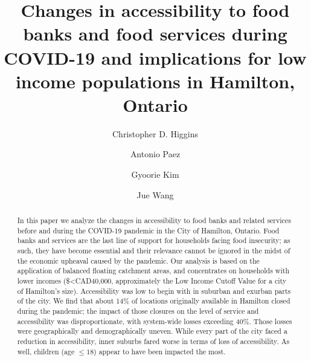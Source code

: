 \documentclass[]{elsarticle} %
\begin{document}
\begin{frontmatter}

  \title{Changes in accessibility to food banks and food services during
COVID-19 and implications for low income populations in Hamilton,
Ontario}
    \author[University of Toronto Scarborough]{Christopher D. Higgins}
    \author[McMaster University]{Antonio Paez}
    \author[University of Toronto Mississauga]{Gyoorie Kim}
    \author[University of Toronto Mississauga]{Jue Wang}
      \address[University of Toronto Scarborough]{Department of
Geography \& Planning, University of Toronto Scarborough, 1265 Military
Trail, Toronto, ON M1C1A4}
    \address[McMaster University]{School of Earth, Environment and
Society, McMaster University, Hamilton, ON, L8S 4K1, Canada}
    \address[University of Toronto Mississauga]{Department of Geography,
Geomatics and Environment, University of Toronto Mississauga, 3359
Mississauga Road, Mississauga, ON, L5L 1C6 , Canada}
  
  \begin{abstract}
  In this paper we analyze the changes in accessibility to food banks
  and related services before and during the COVID-19 pandemic in the
  City of Hamilton, Ontario. Food banks and services are the last line
  of support for households facing food insecurity; as such, they have
  become essential and their relevance cannot be ignored in the midst of
  the economic upheaval caused by the pandemic. Our analysis is based on
  the application of balanced floating catchment areas, and concentrates
  on households with lower incomes (\$\textless CAD40,000, approximately
  the Low Income Cutoff Value for a city of Hamilton's size).
  Accessibility was low to begin with in suburban and exurban parts of
  the city. We find that about 14\% of locations originally available in
  Hamilton closed during the pandemic; the impact of those closures on
  the level of service and accessibility was disproportionate, with
  system-wide losses exceeding 40\%. Those losses were geographically
  and demographically uneven. While every part of the city faced a
  reduction in accessibility, inner suburbs fared worse in terms of loss
  of accessibility. As well, children (age \(\le 18\)) appear to have
  been impacted the most.
  \end{abstract}
  
 \end{frontmatter}
\end{document}
